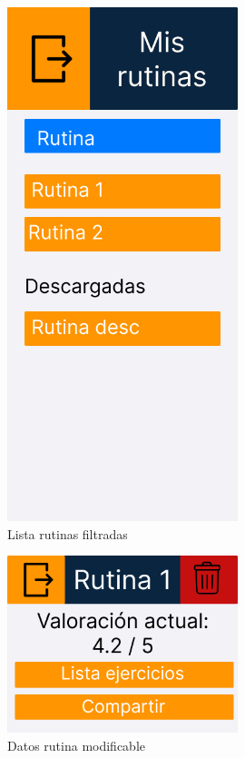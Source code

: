 \begin{figure}[H]
   \centering
    \includegraphics[width=0.6\textwidth]{fotos/Frame 47.png}
    \caption{Lista rutinas filtradas}
    \label{fig:Lista rutinas filtradas}
\end{figure}
\begin{figure}[H]
   \centering
    \includegraphics[width=0.6\textwidth]{fotos/Frame 48.png}
    \caption{Datos rutina modificable}
    \label{fig:Datos rutina modificable}
\end{figure}
